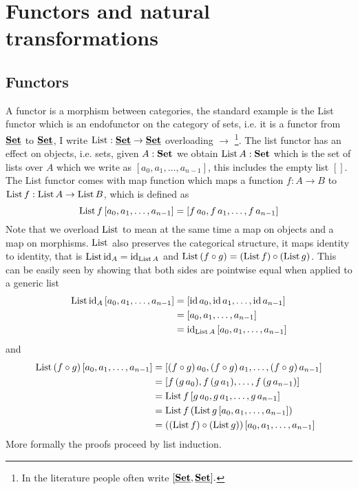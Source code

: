 \newpage
\section{Functors and natural transformations}
\label{sec:funct-natur-transf}

\subsection{Functors}
\label{sec:functors}

A functor is a morphism between categories, the standard example is the List functor which is an endofunctor on the category of sets, i.e. it is a functor from $\underline{\mathbf{\mathbf{Set}}}$ to $\underline{\mathbf{\mathbf{Set}}}$, I write $\mathrm{List} : \underline{\mathbf{\mathbf{Set}}} \to \underline{\mathbf{\mathbf{Set}}}$ overloading $\to$%
\footnote{In the literature people often write $[\underline{\mathbf{\mathbf{Set}}},\underline{\mathbf{\mathbf{Set}}}].$}.
The list functor has an effect on objects, i.e. sets, given $A : \mathbf{Set}$ we obtain $\mathrm{List}\,A : \mathbf{Set}$ which is the set of lists over $A$ which we write as $[a_0,a_1,\dots,a_{n-1}]$, this includes the empty list $[]$.
The List functor comes with map function which maps a function $f : A \to B$ to $\mathrm{List}\,f : \mathrm{List}\,A \to \mathrm{List}\,B$, which is defined as 
\[ \mathrm{List}\,f\, [a_0,a_1,\dots,a_{n-1}] = [f\,a_0,f\,a_1,\dots,f\,a_{n-1}]\]
Note that we overload $\mathrm{List}$ to mean at the same time a map on objects and a map on morphisms. $\mathrm{List}$ also preserves the categorical structure, it maps identity to identity, that is $\mathrm{List}\,\mathrm{id}_A = \mathrm{id}_{\mathrm{List}\,A}$ and 
$\mathrm{List}\,(f\circ g) = (\mathrm{List}\,f) \circ (\mathrm{List}\,g)$. This can be easily seen by showing that both sides are pointwise equal when applied to a generic list
\begin{align*}
\mathrm{List}\,\mathrm{id}_A\, [a_0,a_1,\dots,a_{n-1}] & =  [\mathrm{id}\,a_0,\mathrm{id}\,a_1,\dots,\mathrm{id}\,a_{n-1}] \\
& =  [a_0,a_1,\dots,a_{n-1}] \\
& = \mathrm{id}_{\mathrm{List}\,A}\,  [a_0,a_1,\dots,a_{n-1}]
\end{align*}
and
\begin{align*}
\mathrm{List}\,(f \circ g)\, [a_0,a_1,\dots,a_{n-1}] & =  [(f \circ g)\,a_0,(f\circ g)\,a_1,\dots,(f\circ g)\,a_{n-1}] \\
& =  [f\,(g\,a_0),f\,(g\,a_1),\dots,f \,(g\, a_{n-1})] \\
& = \mathrm{List}\,f\, [g\,a_0,g\,a_1,\dots,g\, a_{n-1}]\\
& = \mathrm{List}\,f\,(\mathrm{List}\,g\, [a_0,a_1,\dots,a_{n-1}])\\
& = ((\mathrm{List}\,f) \circ (\mathrm{List}\,g))\, [a_0,a_1,\dots,a_{n-1}]
\end{align*}
More formally the proofs proceed by list induction.

